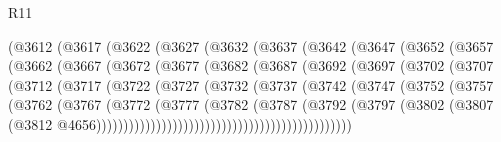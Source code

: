 \begin{lexlean}{R11}
\begin{coremodule}
{{{{{{{{{{{{{{{{{{{{{{{{{{{{{{{{{{{{{{{{{{{{{{{{{{{{{{{{{{{{{{{{{{{{{{{{{{{{{{{{{{                (@3612
                  (@3617
                    (@3622
                      (@3627
                        (@3632
                          (@3637
                            (@3642
                              (@3647
                                (@3652
                                  (@3657
                                    (@3662
                                      (@3667
                                        (@3672
                                          (@3677
                                            (@3682
                                              (@3687
                                                (@3692
                                                  (@3697
                                                    (@3702
                                                      (@3707
                                                        (@3712
                                                          (@3717
                                                            (@3722
                                                              (@3727
                                                                (@3732
                                                                  (@3737
                                                                    (@3742
                                                                      (@3747
                                                                        (@3752
                                                                          (@3757
                                                                            (@3762
                                                                              (@3767
                                                                                (@3772
                                                                                  (@3777
                                                                                    (@3782
                                                                                      (@3787
                                                                                        (@3792
                                                                                          (@3797
                                                                                            (@3802
                                                                                              (@3807
                                                                                                (@3812
                                                                                                  @4656)))))))))))))))))))))))))))))))))))))))))))))))
}}}}}}}}}}}}}}}}}}}}}}}}}}}}}}}}}}}}}}}}}}}}}}}}}}}}}}}}}}}}}}}}}}}}}}}}}}}}}}}}}}
\end{coremodule}
\end{lexlean}
